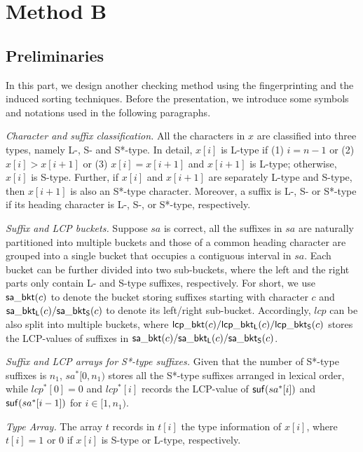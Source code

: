 \documentclass[10pt,journal,compsoc]{IEEEtran}
\begin{document}
\section{Method B} \label{sec:method2}

\subsection{Preliminaries} \label{sec:method2:preliminaries}

In this part, we design another checking method using the fingerprinting and the induced sorting techniques. Before the presentation, we introduce some symbols and notations used in the following paragraphs.

{\em Character and suffix classification.} All the characters in $x$ are classified into three types, namely L-, S- and S*-type. In detail, $x[i]$ is L-type if (1) $i = n - 1$ or (2) $x[i] > x[i + 1]$ or (3) $x[i] = x[i + 1]$ and $x[i + 1]$ is L-type; otherwise, $x[i]$ is S-type. Further, if $x[i]$ and $x[i + 1]$ are separately L-type and S-type, then $x[i + 1]$ is also an S*-type character. Moreover, a suffix is L-, S- or S*-type if its heading character is L-, S-, or S*-type, respectively.

{\em Suffix and LCP buckets.} Suppose $sa$ is correct, all the suffixes in $sa$ are naturally partitioned into multiple buckets and those of a common heading character are grouped into a single bucket that occupies a contiguous interval in $sa$. Each bucket can be further divided into two sub-buckets, where the left and the right parts only contain L- and S-type suffixes, respectively. For short, we use ${\sf sa\_bkt}(c)$ to denote the bucket storing suffixes starting with character $c$ and ${\sf sa\_bkt_L}(c)/{\sf sa\_bkt_S}(c)$ to denote its left/right sub-bucket. Accordingly, $lcp$ can be also split into multiple buckets, where ${\sf lcp\_bkt}(c)/{\sf lcp\_bkt_L}(c)/{\sf lcp\_bkt_S}(c)$ stores the LCP-values of suffixes in ${\sf sa\_bkt}(c)/{\sf sa\_bkt_L}(c)/{\sf sa\_bkt_S}(c)$.

{\em Suffix and LCP arrays for S*-type suffixes.} Given that the number of S*-type suffixes is $n_1$, $sa^*[0, n_1)$ stores all the S*-type suffixes arranged in lexical order, while $lcp^*[0] = 0$ and $lcp^*[i]$ records the LCP-value of ${\sf suf}(sa^*[i])$ and ${\sf suf}(sa^*[i - 1])$ for $i \in [1, n_1)$.

{\em Type Array.} The array $t$ records in $t[i]$ the type information of $x[i]$, where $t[i] = 1$ or $0$ if $x[i]$ is S-type or L-type, respectively.
\end{document}
